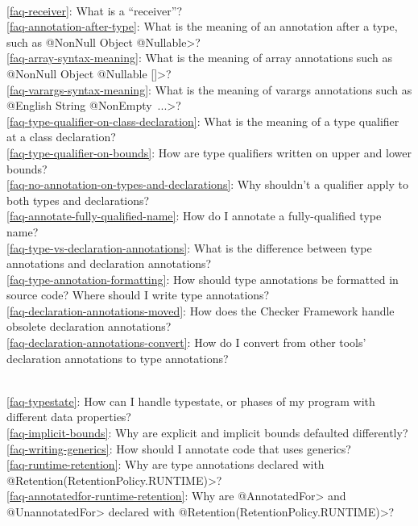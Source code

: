 \\ \ref{faq-receiver}: What is a ``receiver''?
\\ \ref{faq-annotation-after-type}: What is the meaning of an annotation after a type, such as \<@NonNull Object @Nullable>?
\\ \ref{faq-array-syntax-meaning}: What is the meaning of array annotations such as \<@NonNull Object @Nullable []>?
\\ \ref{faq-varargs-syntax-meaning}: What is the meaning of varargs annotations such as \<@English String @NonEmpty~...>?
\\ \ref{faq-type-qualifier-on-class-declaration}: What is the meaning of a type qualifier at a class declaration?
\\ \ref{faq-type-qualifier-on-bounds}: How are type qualifiers written on upper and lower bounds?
\\ \ref{faq-no-annotation-on-types-and-declarations}: Why shouldn't a qualifier apply to both types and declarations?
\\ \ref{faq-annotate-fully-qualified-name}: How do I annotate a
fully-qualified type name?
\\ \ref{faq-type-vs-declaration-annotations}: What is the difference between type annotations and declaration annotations?
\\ \ref{faq-type-annotation-formatting}: How should type annotations be formatted in source code?  Where should I write type annotations?
\\ \ref{faq-declaration-annotations-moved}: How does the Checker Framework handle obsolete declaration annotations?
\\ \ref{faq-declaration-annotations-convert}: How do I convert from other tools' declaration annotations to type annotations?

\\ \ref{faq-typestate}: How can I handle typestate, or phases of my program with different data properties?
\\ \ref{faq-implicit-bounds}: Why are explicit and implicit bounds defaulted differently?
\\ \ref{faq-writing-generics}: How should I annotate code that uses generics?
\\ \ref{faq-runtime-retention}: Why are type annotations declared with \<@Retention(RetentionPolicy.RUNTIME)>?
\\ \ref{faq-annotatedfor-runtime-retention}: Why are \<@AnnotatedFor> and \<@UnannotatedFor> declared with \<@Retention(RetentionPolicy.RUNTIME)>?

